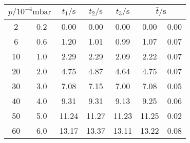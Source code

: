 \label{tab:tabTL1}
	\begin{tabular}{S[table-format=2.0]@{${}\pm{}$} S[table-format=1.1]S[table-format=2.2]S[table-format=2.2]S[table-format=2.2]S[table-format=2.2]@{${}\pm{}$} S[table-format=1.2]}
		\toprule
		 & {$t_1/\si{\second}$} & {$t_2/\si{\second}$} & {$t_3/\si{\second}$} &  \\
		 & 0.2 & 0.00 & 0.00 & 0.00 & 0.00 & 0.00 \\
		 6 & 0.6 & 1.20 & 1.01 & 0.99 & 1.07 & 0.07 \\
		10 & 1.0 & 2.29 & 2.29 & 2.09 & 2.22 & 0.07 \\
		20 & 2.0 & 4.75 & 4.87 & 4.64 & 4.75 & 0.07 \\
		30 & 3.0 & 7.08 & 7.15 & 7.00 & 7.08 & 0.05 \\
		40 & 4.0 & 9.31 & 9.31 & 9.13 & 9.25 & 0.06 \\
		50 & 5.0 & 11.24 & 11.27 & 11.23 & 11.25 & 0.02 \\
		60 & 6.0 & 13.17 & 13.37 & 13.11 & 13.22 & 0.08 \\
		\bottomrule
	\end{tabular}
